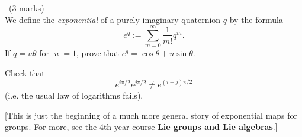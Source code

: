\documentclass[12pt]{article}
\begin{document}
\iffalse
\begin{answer}
  The first part is just a matrix computation. For the second part, observe that
  \[A^{\dagger}=\left(\begin{array}{cc}\bar{a} & \bar{c}\\\bar{b} & \bar{d}\end{array}\right),\qquad A^{-1}=\left(\begin{array}{cc}d & -b\\-c & a\end{array}\right)\]
    so if $A\in SU(2)$ then $c=-\bar{b}$ and $d=\bar{a}$. Moreover, $\det A=ad-bc=a\bar{a}+b\bar{b}=|a|^2+|b|^2=1$. The next line is just obtained by substituting the matrices $\sigma_m$ in and expanding. Finally, we use the isomorphism
    \[G\to SU(2),\qquad t+ix+jy+kz\mapsto t\mathbf{1}+x\sigma_1+y\sigma_2+z\sigma_3.\]
    This is clearly a bijection between the unit quaternions and the matrices in $SU(2)$ (the unit condition becomes the determinant one condition) so we just need to show it is a homomorphism. The multiplication
    \[\left(t_1+x_1\sigma_1+y_1\sigma_2+z_1\sigma_3\right)\left(t_2+x_2\sigma_1+y_2\sigma_2+z_2\sigma_3\right)\]
    is clearly bilinear in the coefficients and therefore it suffices to check that it gives the correct answer on a basis. This is what we did in the first part of the question.
\end{answer}
\newpage
\fi

\vspace{1cm}

\begin{question}\ (3 marks)\\
  We define the {\em exponential} of a purely imaginary quaternion $q$ by the formula
  \[e^q:=\sum_{m=0}^\infty\frac{1}{m!}q^m.\]
  If $q=u\theta$ for $|u|=1$, prove that $e^q=\cos\theta+u\sin\theta$.

  Check that
  \[e^{i\pi/2}e^{j\pi/2}\neq e^{(i+j)\pi/2}\]
  (i.e. the usual law of logarithms fails).
  
  [This is just the beginning of a much more general story of exponential maps for groups. For more, see the 4th year course {\bf Lie groups and Lie algebras}.]
\end{question}

\iffalse
\begin{answer}
  We have
  \begin{align*}
    e^{u\theta}&=1+u\theta+\frac{1}{2!}u^2\theta^2+\frac{1}{3!}u^3\theta^3+\cdots\\
    &=\left(1-\frac{1}{2!}\theta^2+\cdots\right)+u\left(\theta-\frac{1}{3!}\theta^3+\cdots\right)\\
    &=\cos\theta+u\sin\theta.
  \end{align*}
  since $u^2=-1$.

  For the second part we have $e^{i\pi/2}=i$, $e^{j\pi/2}=j$, $ij=k$ and $e^{(i+j)\pi/2}=e^{\frac{i+j}{\sqrt{2}}\frac{\pi}{\sqrt{2}}}=\cos\left(\frac{\pi}{\sqrt{2}}\right)+\frac{i+j}{\sqrt{2}}\sin\left(\frac{\pi}{\sqrt{2}}\right)$ so $e^{i\pi/2}e^{j\pi/2}\neq e^{(i+j)\pi/2}$.
\end{answer}
\newpage
\fi
\end{document}
